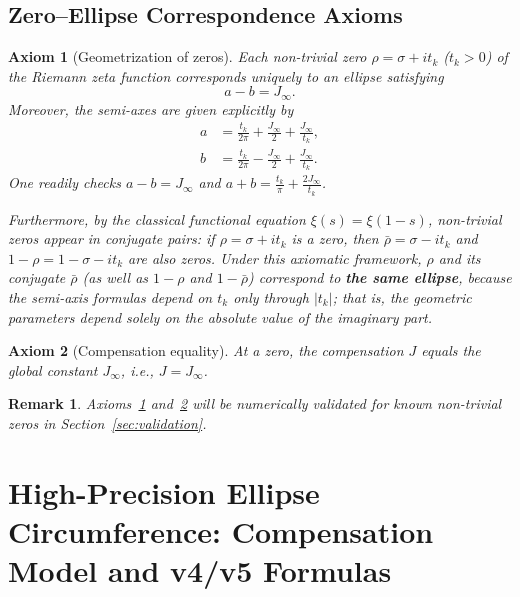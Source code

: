 \documentclass[12pt,a4paper]{article}
\newtheorem{axiom}{Axiom}[section]
\newtheorem{remark}{Remark}[section]
\begin{document}
\subsection{Zero--Ellipse Correspondence Axioms}\label{subsec:axioms}
\begin{axiom}[Geometrization of zeros]\label{ax:1}
Each non-trivial zero $\rho = \sigma + i t_k$ ($t_k>0$) of the Riemann zeta function corresponds uniquely to an ellipse satisfying
\begin{equation}\label{eq:ab-J}
a - b = J_\infty.
\end{equation}
Moreover, the semi-axes are given explicitly by
\begin{align}
a &= \frac{t_k}{2\pi} + \frac{J_\infty}{2} + \frac{J_\infty}{t_k},\label{eq:a}\\
b &= \frac{t_k}{2\pi} - \frac{J_\infty}{2} + \frac{J_\infty}{t_k}.\label{eq:b}
\end{align}
One readily checks $a-b = J_\infty$ and $a+b = \frac{t_k}{\pi} + \frac{2J_\infty}{t_k}$.

Furthermore, by the classical functional equation $\xi(s)=\xi(1-s)$, non-trivial zeros appear in conjugate pairs: if $\rho=\sigma+it_k$ is a zero, then $\bar{\rho}=\sigma-it_k$ and $1-\rho=1-\sigma-it_k$ are also zeros. Under this axiomatic framework, $\rho$ and its conjugate $\bar{\rho}$ (as well as $1-\rho$ and $1-\bar{\rho}$) correspond to \textbf{the same ellipse}, because the semi-axis formulas depend on $t_k$ only through $|t_k|$; that is, the geometric parameters depend solely on the absolute value of the imaginary part.
\end{axiom}

\begin{axiom}[Compensation equality]\label{ax:2}
At a zero, the compensation $J$ equals the global constant $J_\infty$, i.e., $J = J_\infty$.
\end{axiom}

\begin{remark}\label{rem:axiom-validation}
Axioms~\ref{ax:1} and~\ref{ax:2} will be numerically validated for known non-trivial zeros in Section~\ref{sec:validation}.
\end{remark}

\section{High-Precision Ellipse Circumference: Compensation Model and v4/v5 Formulas}\label{sec:ellipse}
\end{document}
